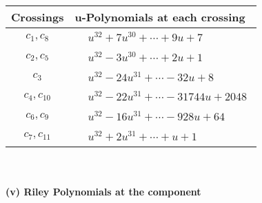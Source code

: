 \documentclass[1p]{elsarticle_modified}
\theoremstyle{definition}
\begin{document}
\begin{tabular}{m{50pt}|m{274pt}}
Crossings & \hspace{64pt}u-Polynomials at each crossing \\
\hline $$\begin{aligned}c_{1},c_{8}\end{aligned}$$&$\begin{aligned}
&u^{32}+7 u^{30}+\cdots+9 u+7
\end{aligned}$\\
\hline $$\begin{aligned}c_{2},c_{5}\end{aligned}$$&$\begin{aligned}
&u^{32}-3 u^{30}+\cdots+2 u+1
\end{aligned}$\\
\hline $$\begin{aligned}c_{3}\end{aligned}$$&$\begin{aligned}
&u^{32}-24 u^{31}+\cdots-32 u+8
\end{aligned}$\\
\hline $$\begin{aligned}c_{4},c_{10}\end{aligned}$$&$\begin{aligned}
&u^{32}-22 u^{31}+\cdots-31744 u+2048
\end{aligned}$\\
\hline $$\begin{aligned}c_{6},c_{9}\end{aligned}$$&$\begin{aligned}
&u^{32}-16 u^{31}+\cdots-928 u+64
\end{aligned}$\\
\hline $$\begin{aligned}c_{7},c_{11}\end{aligned}$$&$\begin{aligned}
&u^{32}+2 u^{31}+\cdots+u+1
\end{aligned}$\\
\hline
\end{tabular}\\~\\
\newpage\renewcommand{\arraystretch}{1}
\flushleft \textbf{(v) Riley Polynomials at the component}\newline \\
\end{document}
